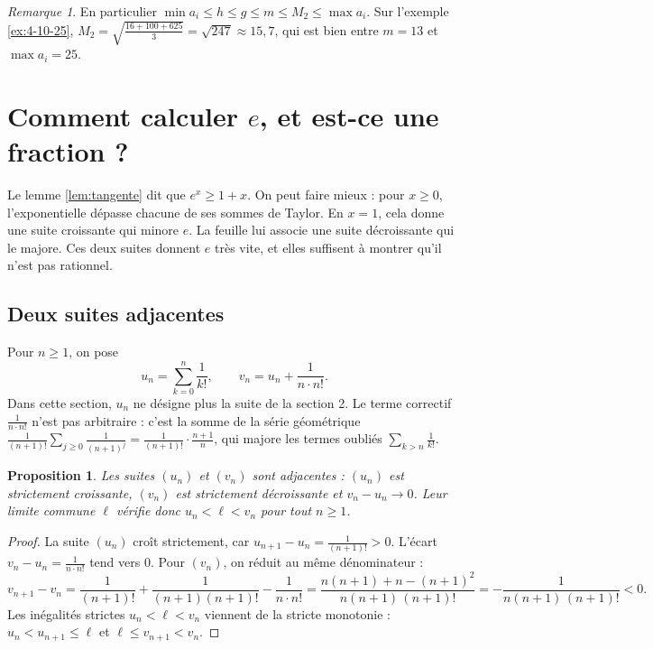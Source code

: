 \documentclass[11pt,a4paper]{article}
\theoremstyle{plain}
\newtheorem{proposition}[theoreme]{Proposition}
\theoremstyle{definition}
\theoremstyle{remark}
\newtheorem{remarque}[theoreme]{Remarque}
\begin{document}
\begin{remarque}
En particulier $\min a_i\leq h\leq g\leq m\leq M_2\leq\max a_i$. Sur l'exemple \ref{ex:4-10-25}, $M_2=\sqrt{\frac{16+100+625}3}=\sqrt{247}\approx15{,}7$, qui est bien entre $m=13$ et $\max a_i=25$.
\end{remarque}

\section{Comment calculer \texorpdfstring{$e$}{e}, et est-ce une fraction ?}

Le lemme \ref{lem:tangente} dit que $e^x\geq1+x$. On peut faire mieux : pour $x\geq0$, l'exponentielle dépasse chacune de ses sommes de Taylor. En $x=1$, cela donne une suite croissante qui minore $e$. La feuille lui associe une suite décroissante qui le majore. Ces deux suites donnent $e$ très vite, et elles suffisent à montrer qu'il n'est pas rationnel.

\subsection{Deux suites adjacentes}

Pour $n\geq1$, on pose
\[
  u_n=\sum_{k=0}^n\frac1{k!},\qquad v_n=u_n+\frac1{n\cdot n!} .
\]
Dans cette section, $u_n$ ne désigne plus la suite de la section 2. Le terme correctif $\frac1{n\cdot n!}$ n'est pas arbitraire : c'est la somme de la série géométrique $\frac1{(n+1)!}\sum_{j\geq0}\frac1{(n+1)^j}=\frac1{(n+1)!}\cdot\frac{n+1}n$, qui majore les termes oubliés $\sum_{k>n}\frac1{k!}$.

\begin{proposition}\label{prop:adjacentes}
Les suites $(u_n)$ et $(v_n)$ sont adjacentes : $(u_n)$ est strictement croissante, $(v_n)$ est strictement décroissante et $v_n-u_n\to0$. Leur limite commune $\ell$ vérifie donc $u_n<\ell<v_n$ pour tout $n\geq1$.
\end{proposition}

\begin{proof}
La suite $(u_n)$ croît strictement, car $u_{n+1}-u_n=\frac1{(n+1)!}>0$. L'écart $v_n-u_n=\frac1{n\cdot n!}$ tend vers $0$. Pour $(v_n)$, on réduit au même dénominateur :
\[
  v_{n+1}-v_n=\frac1{(n+1)!}+\frac1{(n+1)(n+1)!}-\frac1{n\cdot n!}
  =\frac{n(n+1)+n-(n+1)^2}{n(n+1)\,(n+1)!}=-\frac1{n(n+1)\,(n+1)!}<0 .
\]
Les inégalités strictes $u_n<\ell<v_n$ viennent de la stricte monotonie : $u_n<u_{n+1}\leq\ell$ et $\ell\leq v_{n+1}<v_n$.
\end{proof}
\end{document}
